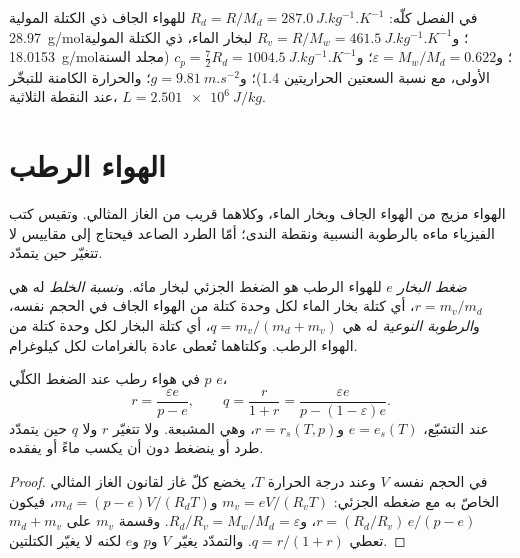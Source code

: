 في الفصل كلّه: $R_d = R/M_d = \qty{287.0}{J.kg^{-1}.K^{-1}}$ للهواء الجاف ذي الكتلة المولية
\qty{28.97}{g/mol}؛ و$R_v = R/M_w = \qty{461.5}{J.kg^{-1}.K^{-1}}$ لبخار الماء، ذي الكتلة
المولية \qty{18.0153}{g/mol}؛ و$\varepsilon = M_w/M_d = 0.622$؛ و$c_p = \tfrac72 R_d =
\qty{1004.5}{J.kg^{-1}.K^{-1}}$ (مجلد السنة الأولى، مع نسبة السعتين الحراريتين 1.4)؛
و$g = \qty{9.81}{m.s^{-2}}$؛ والحرارة الكامنة للتبخّر عند النقطة الثلاثية،
$L = \qty{2.501e6}{J/kg}$.

\section{الهواء الرطب}\label{sec:b2:atmospheric-thermodynamics:moist-air}

الهواء مزيج من الهواء الجاف وبخار الماء، وكلاهما قريب من الغاز المثالي. وتقيس كتب الفيزياء
ماءه بالرطوبة النسبية ونقطة الندى؛ أمّا الطرد الصاعد فيحتاج إلى مقاييس
لا تتغيّر حين يتمدّد.

\begin{definition}\label{def:b2:atmospheric-thermodynamics:moist-air}
\emph{ضغط البخار} $e$ للهواء الرطب هو الضغط الجزئي
لبخار مائه. و\emph{نسبة الخلط} له هي $r = m_v/m_d$، أي كتلة بخار
الماء لكل وحدة كتلة من الهواء الجاف في الحجم نفسه، و\emph{الرطوبة
النوعية} له هي $q = m_v/(m_d + m_v)$، أي كتلة البخار لكل وحدة كتلة من
الهواء الرطب. وكلتاهما تُعطى عادة بالغرامات لكل كيلوغرام.
\end{definition}

\begin{proposition}\label{prop:b2:atmospheric-thermodynamics:humidity}
في هواء رطب عند الضغط الكلّي $p$  $e$،
\[
  r = \frac{\varepsilon e}{p - e}, \qquad q = \frac{r}{1 + r} = \frac{\varepsilon e}{p - (1 -
  \varepsilon)e} .
\]
عند التشبّع، $e = e_s(T)$ و$r = r_s(T, p)$، وهي  المشبعة. ولا تتغيّر $r$ ولا
$q$ حين يتمدّد طرد أو ينضغط دون أن يكسب ماءً أو يفقده.
\end{proposition}

\begin{proof}
في الحجم نفسه $V$ وعند درجة الحرارة $T$، يخضع كلّ غاز لقانون الغاز المثالي الخاصّ به مع
ضغطه الجزئي: $m_v = eV/(R_vT)$ و$m_d = (p - e)V/(R_dT)$، فيكون $r = (R_d/R_v)\,e/(p - e)$،
و$R_d/R_v = M_w/M_d = \varepsilon$. وقسمة $m_v$ على $m_d + m_v$ تعطي $q = r/(1 + r)$.
والتمدّد يغيّر $V$ و$p$ و$e$ لكنه لا يغيّر الكتلتين.
\end{proof}

